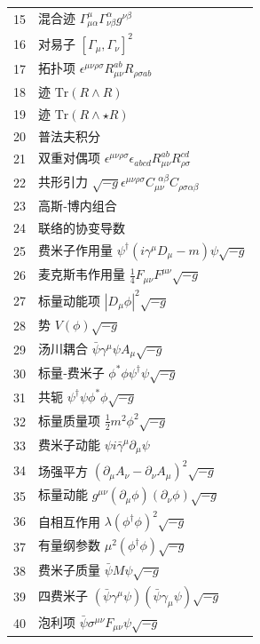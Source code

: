 \documentclass[11pt,a4paper]{article}
\begin{document}
\begin{longtable}{r l}
		15 & 混合迹 \(\Gamma^{\mu}_{\mu\alpha}\Gamma^{\alpha}_{\nu\beta}g^{\nu\beta}\) \\
		16 & 对易子 \([\Gamma_\mu, \Gamma_\nu]^2\) \\
		17 & 拓扑项 \(\epsilon^{\mu\nu\rho\sigma}R_{\mu\nu}^{ab}R_{\rho\sigma ab}\) \\
		18 & 迹 \(\mathrm{Tr}(R\wedge R)\) \\
		19 & 迹 \(\mathrm{Tr}(R\wedge\star R)\) \\
		20 & 普法夫积分 \\
		21 & 双重对偶项 \(\epsilon^{\mu\nu\rho\sigma}\epsilon_{abcd}R_{\mu\nu}^{ab}R_{\rho\sigma}^{cd}\) \\
		22 & 共形引力 \(\sqrt{-g}\epsilon^{\mu\nu\rho\sigma}C_{\mu\nu}^{\ \ \alpha\beta}C_{\rho\sigma\alpha\beta}\) \\
		23 & 高斯‑博内组合 \\
		24 & 联络的协变导数 \\
		25 & 费米子作用量 \(\psi^\dagger(i\gamma^\mu D_\mu - m)\psi\sqrt{-g}\) \\
		26 & 麦克斯韦作用量 \(\frac{1}{4}F_{\mu\nu}F^{\mu\nu}\sqrt{-g}\) \\
		27 & 标量动能项 \(|D_\mu\phi|^2\sqrt{-g}\) \\
		28 & 势 \(V(\phi)\sqrt{-g}\) \\
		29 & 汤川耦合 \(\bar{\psi}\gamma^\mu\psi A_\mu\sqrt{-g}\) \\
		30 & 标量‑费米子 \(\phi^*\phi\psi^\dagger\psi\sqrt{-g}\) \\
		31 & 共轭 \(\psi^\dagger\psi\phi^*\phi\sqrt{-g}\) \\
		32 & 标量质量项 \(\frac{1}{2}m^2\phi^2\sqrt{-g}\) \\
		33 & 费米子动能 \(\psi i\bar{\gamma}^\mu\partial_\mu\psi\) \\
		34 & 场强平方 \((\partial_\mu A_\nu - \partial_\nu A_\mu)^2\sqrt{-g}\) \\
		35 & 标量动能 \(g^{\mu\nu}(\partial_\mu\phi)(\partial_\nu\phi)\sqrt{-g}\) \\
		36 & 自相互作用 \(\lambda(\phi^\dagger\phi)^2\sqrt{-g}\) \\
		37 & 有量纲参数 \(\mu^2(\phi^\dagger\phi)\sqrt{-g}\) \\
		38 & 费米子质量 \(\bar{\psi}M\psi\sqrt{-g}\) \\
		39 & 四费米子 \((\bar{\psi}\gamma^\mu\psi)(\bar{\psi}\gamma_\mu\psi)\sqrt{-g}\) \\
		40 & 泡利项 \(\bar{\psi}\sigma^{\mu\nu}F_{\mu\nu}\psi\sqrt{-g}\) \\

\end{longtable}
\end{document}
